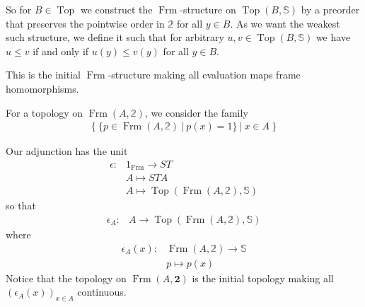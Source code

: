\documentclass[12pt,a4paper]{article}
\DeclareMathOperator{\Frm}{Frm}
\DeclareMathOperator{\Top}{Top}
\begin{document}
So for $B \in \Top$ we construct the $\Frm$-structure on $\Top(B, \mathbb{S})$ by a preorder that preserves the pointwise order in $\mathbb{2}$ for all $y \in B$. As we want the weakest such structure, we define it such that for  arbitrary $ u, v \in \Top(B, \mathbb{S})$ we have $u \leq v$ if and only if $u(y) \leq v(y)$ for all $y \in B$. 

This is the initial $\Frm$-structure making all evaluation maps frame homomorphisms.




For a topology on $\Frm(A, \mathbb{2})$, we consider the family \begin{align*}
	\{ \  \{p \in \Frm(A, \mathbb{2}) \   \lvert \  p(x) = 1 \} \ \lvert \ x \in A \ \} 
\end{align*} 

Our adjunction has the unit
\begin{align*}
	\epsilon:& 1_{\Frm} \to ST\\
	&A \mapsto STA\\
	&A \mapsto \Top(\Frm(A, \mathbb{2}), \mathbb{S})
\end{align*}
so that 
\begin{align*}
	\epsilon_A:& A \to \Top(\Frm(A, \mathbb{2}), \mathbb{S})
\end{align*}
where 
\begin{align*}
	\epsilon_A(x):& \Frm(A, \mathbb{2}) \to \mathbb{S}\\
	&p \mapsto p(x)
\end{align*}
Notice that the topology on $\Frm(A, \mathbf{2})$ is the initial topology making all $(\epsilon_A(x))_{x \in A}$ continuous.
\end{document}
